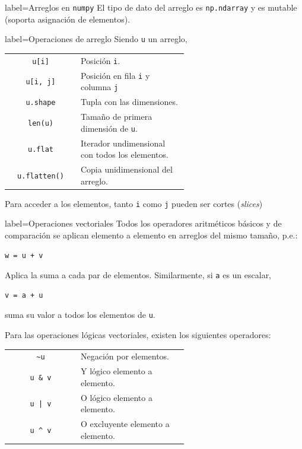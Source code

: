 \documentclass[10pt]{article}
\begin{document}
\begin{multicols*}{3}
\begin{contentbox}{label=Arreglos en \lstinline!numpy!}
    El tipo de dato del arreglo es \lstinline!np.ndarray! y es mutable (soporta asignación de elementos).
\end{contentbox}

\begin{contentbox}{label=Operaciones de arreglo}
    Siendo \lstinline!u! un arreglo,
    
    \begin{tabular}{C|p{0.6\linewidth}}
        \lstinline!u[i]! & Posición \lstinline!i!. \\
        \lstinline!u[i, j]! & Posición en fila \lstinline!i! y columna \lstinline!j! \\
        \lstinline!u.shape! & Tupla con las dimensiones. \\
        \lstinline!len(u)! & Tamaño de primera dimensión de \lstinline!u!. \\
        \lstinline!u.flat! & Iterador undimensional con todos los elementos. \\
        \lstinline!u.flatten()! & Copia unidimensional del arreglo.
    \end{tabular}
    
    Para acceder a los elementos, tanto \lstinline!i! como \lstinline!j! pueden ser cortes (\textit{slices})
\end{contentbox}

\begin{contentbox}{label=Operaciones vectoriales}
    Todos los operadores aritméticos básicos y de comparación se aplican elemento a elemento en arreglos del mismo tamaño, p.e.:
\begin{lstlisting}
w = u + v
\end{lstlisting}
    Aplica la suma a cada par de elementos. Similarmente, si \lstinline!a! es un escalar,
\begin{lstlisting}
v = a + u
\end{lstlisting}
    suma su valor a todos los elementos de \lstinline!u!.
    
    Para las operaciones lógicas vectoriales, existen los siguientes operadores:
    
    \begin{tabular}{C|p{0.6\linewidth}}
        \lstinline!~u! & Negación por elementos. \\
        \lstinline!u & v! & Y lógico elemento a elemento. \\
        \lstinline!u | v! & O lógico elemento a elemento. \\
        \lstinline!u ^ v! & O excluyente elemento a elemento. \\
    \end{tabular}
    

\end{contentbox}
\end{multicols*}
\end{document}
